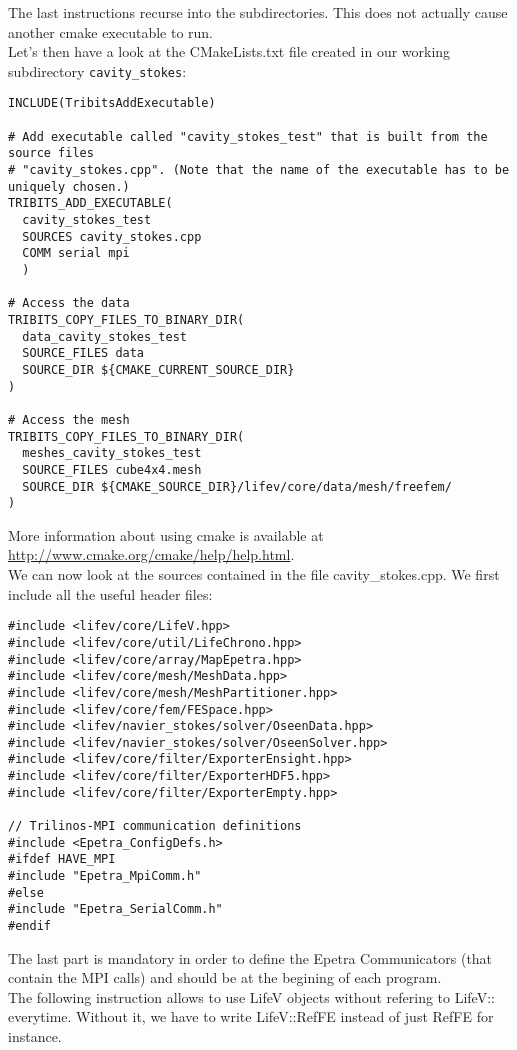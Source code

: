 \noindent The last instructions recurse into the subdirectories. This does not actually cause another cmake executable to run.\\
\indent Let's then have a look at the CMakeLists.txt file created in our working subdirectory \verb!cavity_stokes!:

\begin{verbatim}
INCLUDE(TribitsAddExecutable)

# Add executable called "cavity_stokes_test" that is built from the source files
# "cavity_stokes.cpp". (Note that the name of the executable has to be uniquely chosen.) 
TRIBITS_ADD_EXECUTABLE(
  cavity_stokes_test
  SOURCES cavity_stokes.cpp
  COMM serial mpi
  )

# Access the data
TRIBITS_COPY_FILES_TO_BINARY_DIR(
  data_cavity_stokes_test
  SOURCE_FILES data
  SOURCE_DIR ${CMAKE_CURRENT_SOURCE_DIR}
)

# Access the mesh
TRIBITS_COPY_FILES_TO_BINARY_DIR(
  meshes_cavity_stokes_test
  SOURCE_FILES cube4x4.mesh
  SOURCE_DIR ${CMAKE_SOURCE_DIR}/lifev/core/data/mesh/freefem/
)
\end{verbatim}

\noindent More information about using cmake is available at \url{http://www.cmake.org/cmake/help/help.html}.\\  \indent We can now look at the sources contained in the file cavity\_stokes.cpp. We first include all the useful header files:

\begin{verbatim}
#include <lifev/core/LifeV.hpp>
#include <lifev/core/util/LifeChrono.hpp>
#include <lifev/core/array/MapEpetra.hpp>
#include <lifev/core/mesh/MeshData.hpp>
#include <lifev/core/mesh/MeshPartitioner.hpp>
#include <lifev/core/fem/FESpace.hpp>
#include <lifev/navier_stokes/solver/OseenData.hpp>
#include <lifev/navier_stokes/solver/OseenSolver.hpp>
#include <lifev/core/filter/ExporterEnsight.hpp>
#include <lifev/core/filter/ExporterHDF5.hpp>
#include <lifev/core/filter/ExporterEmpty.hpp>

// Trilinos-MPI communication definitions
#include <Epetra_ConfigDefs.h>
#ifdef HAVE_MPI
#include "Epetra_MpiComm.h"
#else
#include "Epetra_SerialComm.h"
#endif
\end{verbatim}

\noindent The last part is mandatory in order to define the Epetra Communicators (that contain the MPI calls) and should be at the begining of each program.\\
\indent The following instruction allows to use LifeV objects without refering to LifeV:: everytime.
Without it, we have to write LifeV::RefFE instead of just RefFE for instance.

